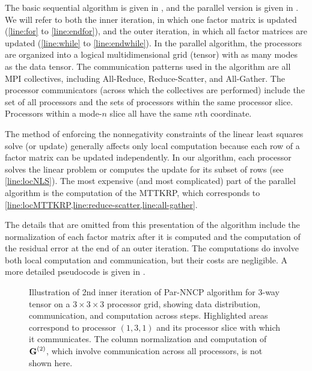 The basic sequential algorithm is given in , and the parallel version is given in .
We will refer to both the inner iteration, in which one factor matrix is updated (\cref{line:for} to \cref{line:endfor}), and the outer iteration, in which all factor matrices are updated (\cref{line:while} to \cref{line:endwhile}).
In the parallel algorithm, the processors are organized into a logical multidimensional grid (tensor) with as many modes as the data tensor.
The communication patterns used in the algorithm are all MPI collectives, including All-Reduce, Reduce-Scatter, and All-Gather.
The processor communicators (across which the collectives are performed) include the set of all processors and the sets of processors within the same processor slice.
Processors within a mode-$n$ slice all have the same $n$th coordinate.

The method of enforcing the nonnegativity constraints of the linear least squares solve (or update) generally affects only local computation because each row of a factor matrix can be updated independently.
In our algorithm, each processor solves the linear problem or computes the update for its subset of rows (see \cref{line:locNLS}). 
The most expensive (and most complicated) part of the parallel algorithm is the computation of the MTTKRP, which corresponds to \cref{line:locMTTKRP,line:reduce-scatter,line:all-gather}.

The details that are omitted from this presentation of the algorithm include the normalization of each factor matrix after it is computed and the computation of the residual error at the end of an outer iteration.
The computations do involve both local computation and communication, but their costs are negligible.
A more detailed pseudocode is given in .


\begin{figure}[t]
\centering
    \quad
    \quad
   \quad
   \quad
  \caption{Illustration of 2nd inner iteration of Par-NNCP algorithm for 3-way tensor on a $3\times3\times3$ processor grid, showing data distribution, communication, and computation across steps.  Highlighted areas correspond to processor $(1,3,1)$ and its processor slice with which it communicates.  The column normalization and computation of $\Mn{G}{2}$, which involve communication across all processors, is not shown here.}
  \label{fig:inner} 
\end{figure}

